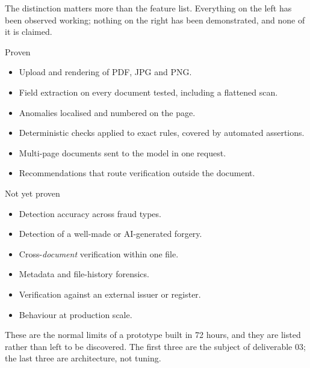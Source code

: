 \documentclass[10pt,a4paper]{article}
\begin{document}
The distinction matters more than the feature list. Everything on the left has
been observed working; nothing on the right has been demonstrated, and none of
it is claimed.

\vspace{3pt}
\noindent
\begin{minipage}[t]{0.485\linewidth}
\begin{goodbox}{Proven}
\begin{itemize}[leftmargin=14pt,itemsep=3pt,topsep=1pt,
                label=\textcolor{good}{\small$\checkmark$}]
  \item Upload and rendering of PDF, JPG and PNG.
  \item Field extraction on every document tested, including a flattened scan.
  \item Anomalies localised and numbered on the page.
  \item Deterministic checks applied to exact rules, covered by automated
        assertions.
  \item Multi-page documents sent to the model in one request.
  \item Recommendations that route verification outside the document.
\end{itemize}
\end{goodbox}
\end{minipage}\hfill
\begin{minipage}[t]{0.485\linewidth}
\begin{badbox}{Not yet proven}
\begin{itemize}[leftmargin=14pt,itemsep=3pt,topsep=1pt,
                label=\textcolor{bad}{\small$\times$}]
  \item Detection accuracy across fraud types.
  \item Detection of a well-made or AI-generated forgery.
  \item Cross-\emph{document} verification within one file.
  \item Metadata and file-history forensics.
  \item Verification against an external issuer or register.
  \item Behaviour at production scale.
\end{itemize}
\end{badbox}
\end{minipage}

\vspace{4pt}
These are the normal limits of a prototype built in 72 hours, and they are
listed rather than left to be discovered. The first three are the subject of
deliverable 03; the last three are architecture, not tuning.
\end{document}
